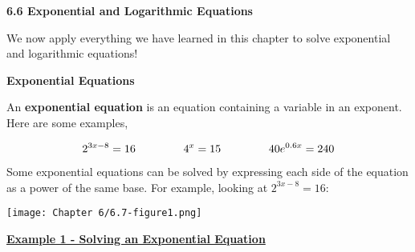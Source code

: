 \documentclass[12pt]{book}
\newcommand{\D}{\displaystyle}
\begin{document}
\begin{comment}
Name: \underline{\hspace{100mm}}
\vspace{20mm}
  \centerline{\Large \textbf{Chapter 2: Equations and Inequalities} } 

{\large
\begin{center}
\begin{varwidth}{\textwidth}
\begin{enumerate}[2.1]
    \item The Regular Coordinate System and Graphs
    \item Linear Equations in One Variable
    \item Models and  Applications (Skipping)
    \item Complex Numbers
    \item Quadratic Equations
    \item Other Types of Equations
    \item Linear Inequalities and Absolute Value Inequalities
\end{enumerate}
\end{varwidth}
\end{center}

}
\newpage  
\end{comment}

{\Large \textbf{6.6 Exponential and Logarithmic Equations}}

We now apply everything we have learned in this chapter to solve exponential and logarithmic equations! 

\vspace{2mm}

{\large \textbf{Exponential Equations}}

An \textbf{exponential equation} is an equation containing a variable in an exponent. Here are some examples,


    $$\D 2^{3x-8}=16  \hspace{15mm} 4^x = 15 \hspace{15mm} 40e^{0.6x}=240$$

Some exponential equations can be solved by expressing each side of the equation as a power of the same base. For example, looking at $2^{3x-8}=16$:


\vspace{100mm}


\centerline{\texttt{[image: Chapter 6/6.7-figure1.png]}}
\newpage

\underline{\textbf{Example 1 - Solving an Exponential Equation}}
\vspace{1mm}
\end{document}
